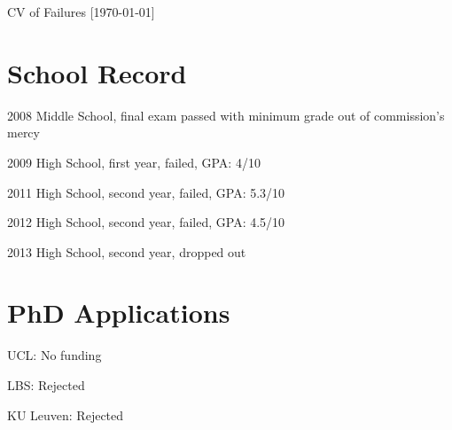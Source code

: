 \documentclass[11pt,a4paper]{article}
\begin{document}
\date{}
\thispagestyle{empty}
\setlength\cvlabelwidth{90pt}

\begin{cv}{\huge CV of Failures \large{[\today ]}}


\section{School Record}

\begin{cvlist}{}
	\item[2008] Middle School, final exam passed with minimum grade out of commission's mercy
	\item[2009] High School, first year,  failed, GPA: 4/10
	\item[2011] High School, second year,  failed, GPA: 5.3/10
	\item[2012] High School, second year,  failed, GPA: 4.5/10
	\item[2013] High School, second year,  dropped out
\end{cvlist}

\section{PhD Applications }

\begin{cvlist}{}
	\item[UCL: ] No funding
	\item[LBS: ] Rejected
	\item[KU Leuven: ] Rejected
\end{cvlist}


\end{cv}
\end{document}
